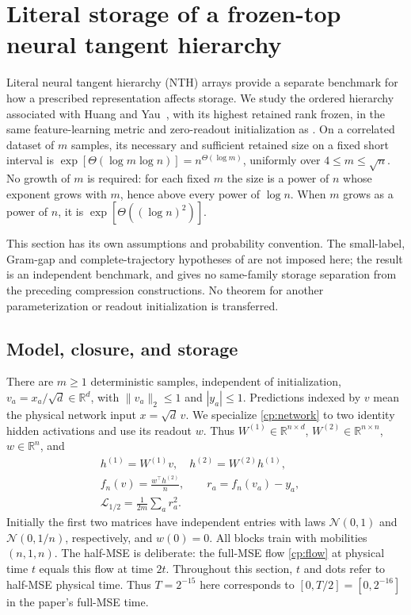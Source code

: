 \section{Literal storage of a frozen-top neural tangent
hierarchy}\label{cp:nth:storage}

Literal neural tangent hierarchy (NTH) arrays provide a separate benchmark
for how a prescribed representation affects storage. We study the ordered
hierarchy associated with Huang and Yau~\cite{huang2020nth}, with its highest
retained rank frozen, in the same feature-learning metric and zero-readout
initialization as . On a correlated dataset of \(m\)
samples, its necessary and sufficient retained size on a fixed short
interval is
\(\exp[\Theta(\log m\log n)]=n^{\Theta(\log m)}\), uniformly over
\(4\le m\le\sqrt n\). No growth of \(m\) is required: for each fixed \(m\)
the size is a power of \(n\) whose exponent grows with \(m\), hence above
every power of \(\log n\). When \(m\) grows as a power of \(n\), it is
\(\exp[\Theta((\log n)^2)]\).

This section has its own assumptions and probability convention. The
small-label, Gram-gap and complete-trajectory hypotheses of
 are not imposed here; the result is an independent
benchmark, and gives no same-family storage separation from the preceding
compression constructions. No theorem for another parameterization or
readout initialization is transferred.

\subsection{Model, closure, and storage}\label{cp:nth:setup}

There are \(m\ge1\) deterministic samples, independent of
initialization, \(v_a=x_a/\sqrt d\in\mathbb R^d\), with
\(\|v_a\|_2\le1\) and \(|y_a|\le1\). Predictions indexed by \(v\) mean
the physical network input \(x=\sqrt d\,v\). We specialize \eqref{cp:network} to two identity hidden activations
and use its readout \(w\). Thus
\(W^{(1)}\in\mathbb R^{n\times d}\),
\(W^{(2)}\in\mathbb R^{n\times n}\), \(w\in\mathbb R^n\), and
\begin{equation}\label{cp:nth:eq:network}{\begin{gathered}
h^{(1)}=W^{(1)}v,\quad h^{(2)}=W^{(2)}h^{(1)},\quad\\
f_n(v)=\frac{w^\top h^{(2)}}n,\qquad
r_a=f_n(v_a)-y_a,\quad\\ \mathcal L_{1/2}=\frac1{2m}\sum_a r_a^2.
\end{gathered}}\end{equation} Initially the first two matrices have
independent entries with laws \(\mathcal N(0,1)\) and
\(\mathcal N(0,1/n)\), respectively, and \(w(0)=0\). All blocks
train with mobilities \((n,1,n)\). The half-MSE is deliberate: the
full-MSE flow \eqref{cp:flow} at physical time \(t\) equals this flow
at time \(2t\). Throughout this section, \(t\) and dots refer to
half-MSE physical time. Thus \(T=2^{-15}\) here corresponds to
\([0,T/2]=[0,2^{-16}]\) in the paper's full-MSE time.

